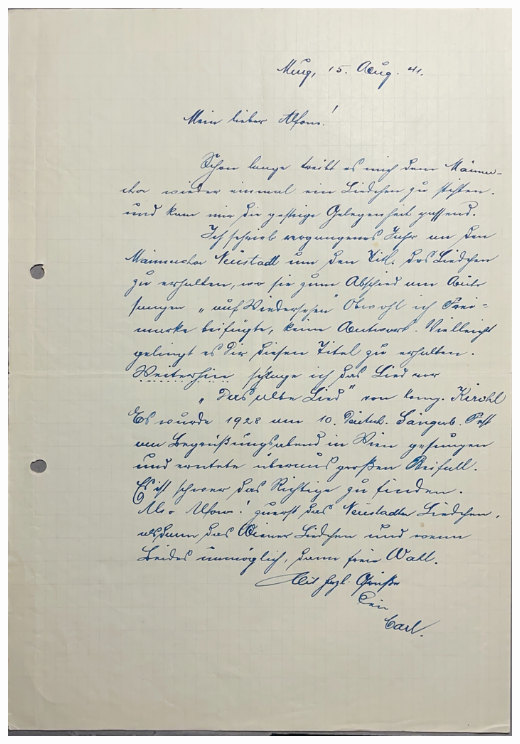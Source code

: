 \documentclass[12pt, a4paper, ngerman, bidi=default]{article}
\begin{document}
    \includegraphics[width=\paperwidth]{./assets/Images/Akte_076_S001.jpg}
\end{document}
